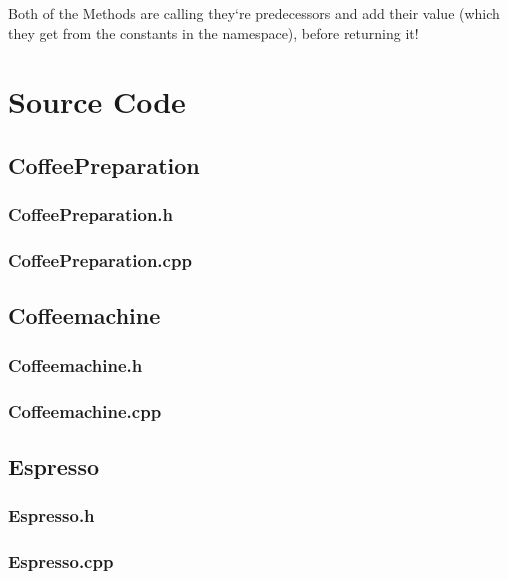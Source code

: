 Both of the Methods are calling they`re predecessors and add their value (which they get from the constants in the namespace), before returning it!

\newpage

\section{Source Code}

\subsection{CoffeePreparation}
\subsubsection{CoffeePreparation.h}
\subsubsection{CoffeePreparation.cpp}
\newpage

\subsection{Coffeemachine}
\subsubsection{Coffeemachine.h}
\subsubsection{Coffeemachine.cpp}
\newpage

\subsection{Espresso}
\subsubsection{Espresso.h}
\subsubsection{Espresso.cpp}
\newpage


